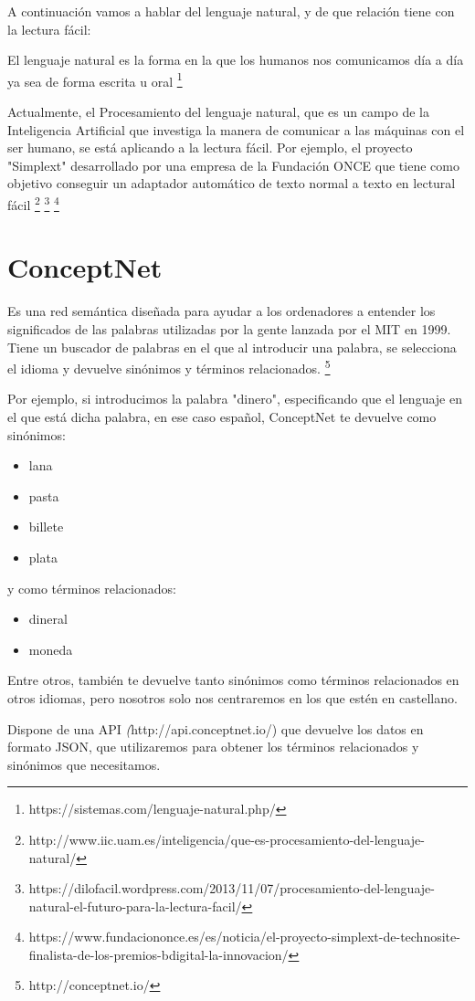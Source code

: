 A continuación vamos a hablar del lenguaje natural, y de que relación tiene con la lectura fácil:

El lenguaje natural es la forma en la que los humanos nos comunicamos día a día ya sea de forma escrita u oral
\footnote{https://sistemas.com/lenguaje-natural.php/}

Actualmente, el Procesamiento del lenguaje natural, que es un campo de la Inteligencia Artificial que investiga la manera de comunicar a las máquinas con el ser humano, se está aplicando a la lectura fácil. Por ejemplo, el proyecto "Simplext" desarrollado por una empresa de la Fundación ONCE que tiene como objetivo conseguir un adaptador automático de texto normal a texto en lectural fácil
\footnote{http://www.iic.uam.es/inteligencia/que-es-procesamiento-del-lenguaje-natural/}
\footnote{https://dilofacil.wordpress.com/2013/11/07/procesamiento-del-lenguaje-natural-el-futuro-para-la-lectura-facil/}
\footnote{https://www.fundaciononce.es/es/noticia/el-proyecto-simplext-de-technosite-finalista-de-los-premios-bdigital-la-innovacion/}


\section{ConceptNet} 

Es una red semántica diseñada para ayudar a los ordenadores a entender los significados de las palabras utilizadas por la gente lanzada por el MIT en 1999.
Tiene un buscador de palabras en el que al introducir una palabra, se selecciona el idioma y devuelve sinónimos y términos relacionados.
\footnote{http://conceptnet.io/}

Por ejemplo, si introducimos la palabra "dinero", especificando que el lenguaje en el que está dicha palabra, en ese caso español, ConceptNet te devuelve como sinónimos:
\begin{itemize}
	\item lana
	\item pasta
	\item billete
	\item plata
\end{itemize}
y como términos relacionados:
\begin{itemize}
	\item dineral
	\item moneda
\end{itemize}
Entre otros, también te devuelve tanto sinónimos como términos relacionados en otros idiomas, pero nosotros solo nos centraremos en los que estén en castellano.

Dispone de una API \textit({http://api.conceptnet.io/}) que devuelve los datos en formato JSON, que utilizaremos para obtener los términos relacionados y sinónimos que necesitamos.
